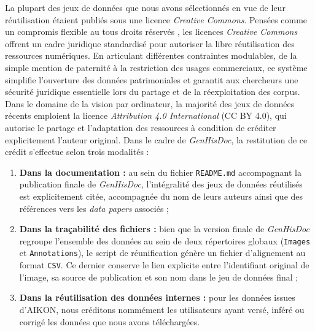 La plupart des jeux de données que nous avons sélectionnés en vue de leur réutilisation étaient publiés sous une licence \textit{Creative Commons}. Pensées comme un compromis flexible au \og tous droits réservés \fg, les licences \textit{Creative Commons} offrent un cadre juridique standardisé pour autoriser la libre réutilisation des ressources numériques. En articulant différentes contraintes modulables, de la simple mention de paternité à la restriction des usages commerciaux, ce système simplifie l'ouverture des données patrimoniales et garantit aux chercheurs une sécurité juridique essentielle lors du partage et de la réexploitation des corpus. Dans le domaine de la vision par ordinateur, la majorité des jeux de données récents emploient la licence \textit{Attribution 4.0 International }(CC BY 4.0), qui autorise le partage et l'adaptation des ressources à condition de créditer explicitement l'auteur original. Dans le cadre de \textit{GenHisDoc}, la restitution de ce crédit s'effectue selon trois modalités :

\begin{enumerate}
	\item \textbf{Dans la documentation :} au sein du fichier \texttt{README.md} accompagnant la publication finale de \textit{GenHisDoc}, l'intégralité des jeux de données réutilisés est explicitement citée, accompagnée du nom de leurs auteurs ainsi que des références vers les \textit{data papers} associés ;
	\item \textbf{Dans la traçabilité des fichiers :} bien que la version finale de \textit{GenHisDoc} regroupe l'ensemble des données au sein de deux répertoires globaux (\texttt{Images} et \texttt{Annotations}), le script de \og réunification \fg{} génère un fichier d'alignement au format \texttt{CSV}. Ce dernier conserve le lien explicite entre l'identifiant original de l'image, sa source de publication et son nom dans le jeu de données final ;
	\item \textbf{Dans la réutilisation des données internes :} pour les données issues d'AIKON, nous créditons nommément les utilisateurs ayant versé, inféré ou corrigé les données que nous avons téléchargées.
\end{enumerate}

